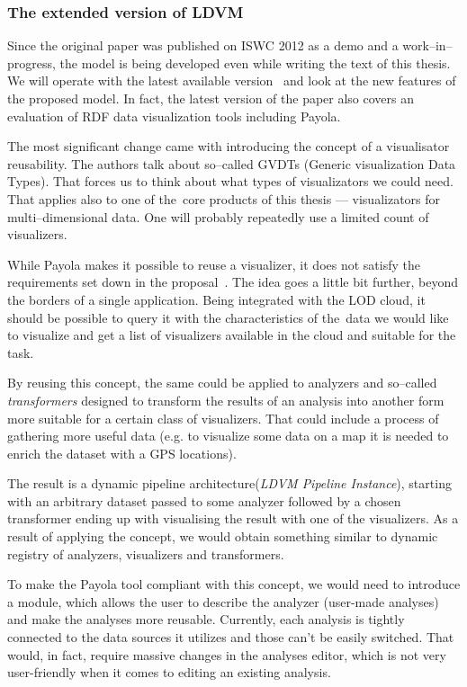 \subsubsection{The extended version of LDVM}
Since the original paper was published on ISWC 2012 as a demo and a
work--in--progress, the model is being developed even while writing the text of 
this thesis. We will operate with the latest available version~\cite{ldvm2} and look 
at the new features of the proposed model. In fact, the latest version of the 
paper also covers an evaluation of RDF data visualization tools including 
Payola.

The most significant change came with introducing the concept of a visualisator 
reusability. The authors talk about so--called GVDTs (Generic visualization Data Types).
That forces us to think about what types of visualizators we could need. That applies also to
one of the~core products of this thesis --- visualizators for multi--dimensional data.
One will probably repeatedly use a limited count of visualizers.

While Payola makes it possible to reuse a visualizer, it does not satisfy the 
requirements set down in the proposal~\cite{ldvm2}. The idea goes a little bit 
further, beyond the borders of a single application. Being integrated with the 
LOD cloud, it should be possible to query it with the characteristics of 
the~data we would like to visualize and get a list of visualizers 
available in the cloud and suitable for the task.

By reusing this concept, the same could be applied to analyzers and so--called 
\emph{transformers} designed to transform the results of an analysis 
into another form more suitable for a certain class of visualizers. 
That could include a process of gathering more useful data (e.g. to visualize 
some data on a map it is needed to enrich the dataset with a GPS locations).

The result is a dynamic pipeline architecture(\emph{LDVM Pipeline Instance}),
starting with an arbitrary 
dataset passed to some analyzer followed by a chosen transformer ending up with
visualising the result with one of the visualizers. As a result of applying the concept,
we would obtain something similar to dynamic 
registry of analyzers, visualizers and transformers.

To make the Payola tool 
compliant with this concept, we would need to introduce a module, which allows the user to describe the analyzer (user-made analyses) and make the 
analyses more reusable. Currently, each analysis is tightly connected to the 
data sources it utilizes and those can't be easily switched. That would, in 
fact, require massive changes in the analyses editor, which is not very 
user-friendly when it comes to editing an existing analysis.

